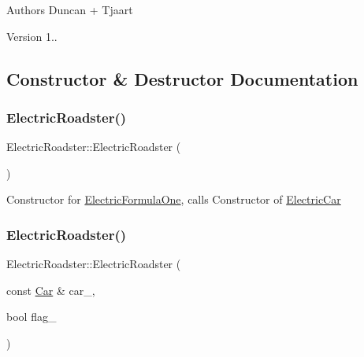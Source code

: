 \begin{DoxyAuthor}{Authors}
Duncan + Tjaart 
\end{DoxyAuthor}
\begin{DoxyVersion}{Version}
1.. 
\end{DoxyVersion}


\subsection{Constructor \& Destructor Documentation}
\mbox{\label{class_electric_roadster_a3fc84d2d94078f67a1da29fd4be0fe0e}} 
\subsubsection{\texorpdfstring{Electric\+Roadster()}{ElectricRoadster()}\hspace{0.1cm}{\footnotesize\ttfamily [1/2]}}
{\footnotesize\ttfamily Electric\+Roadster\+::\+Electric\+Roadster (\begin{DoxyParamCaption}{ }\end{DoxyParamCaption})\hspace{0.3cm}{\ttfamily [inline]}}

Constructor for \mbox{\hyperlink{class_electric_formula_one}{Electric\+Formula\+One}}, calls Constructor of \mbox{\hyperlink{class_electric_car}{Electric\+Car}} \mbox{\label{class_electric_roadster_a4d5d496f3f7ec8dd9832c2a40382ffc9}} 
\subsubsection{\texorpdfstring{Electric\+Roadster()}{ElectricRoadster()}\hspace{0.1cm}{\footnotesize\ttfamily [2/2]}}
{\footnotesize\ttfamily Electric\+Roadster\+::\+Electric\+Roadster (\begin{DoxyParamCaption}\item[{const \mbox{\hyperlink{class_car}{Car}} \&}]{car\+\_\+,  }\item[{bool}]{flag\+\_\+ }\end{DoxyParamCaption})\hspace{0.3cm}{\ttfamily [inline]}}

